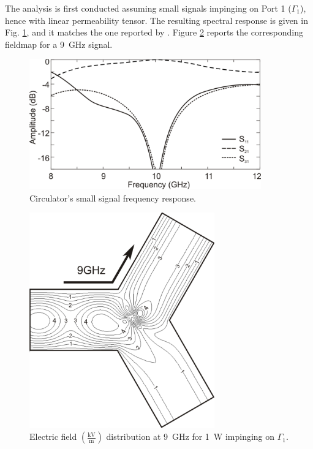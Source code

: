 The analysis is first conducted assuming small signals impinging on Port 1 ($\Gamma_1$), hence with linear permeability tensor. The resulting spectral response is given in Fig. \ref{fig:circresplin}, and it matches the one reported by \cite{koshiba1986finite}. Figure \ref{fig:linfield} reports the corresponding fieldmap for a 9~GHz signal.

\begin{figure}[!ht]
\centering
\includegraphics[width=10cm]{circresplin}
\caption{Circulator's small signal frequency response.}
\label{fig:circresplin}
\end{figure}

\begin{figure}[!ht]
\centering
\includegraphics[width=8cm]{linfield}
\caption{Electric field $\left(\frac{\mathrm{kV}}{\mathrm{m}}\right)$ distribution at 9~GHz for 1~W impinging on $\Gamma_1$.}
\label{fig:linfield}
\end{figure}
 
